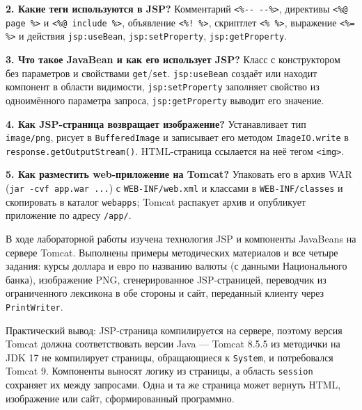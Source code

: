 \documentclass[14pt,a4paper]{extarticle}
\begin{document}
\textbf{2. Какие теги используются в JSP?} Комментарий \texttt{<\%-{}- -{}-\%>},
директивы \texttt{<\%@ page \%>} и \texttt{<\%@ include \%>}, объявление
\texttt{<\%! \%>}, скриптлет \texttt{<\% \%>}, выражение \texttt{<\%= \%>} и действия
\texttt{jsp:useBean}, \texttt{jsp:setProperty}, \texttt{jsp:getProperty}.

\textbf{3. Что такое JavaBean и как его использует JSP?} Класс с конструктором без
параметров и свойствами \texttt{get}/\texttt{set}. \texttt{jsp:useBean} создаёт или
находит компонент в области видимости, \texttt{jsp:setProperty} заполняет свойство из
одноимённого параметра запроса, \texttt{jsp:getProperty} выводит его значение.

\textbf{4. Как JSP-страница возвращает изображение?} Устанавливает тип
\texttt{image/png}, рисует в \texttt{BufferedImage} и записывает его методом
\texttt{ImageIO.write} в \texttt{response.getOutputStream()}. HTML-страница ссылается на
неё тегом \texttt{<img>}.

\textbf{5. Как разместить web-приложение на Tomcat?} Упаковать его в архив WAR
(\texttt{jar -cvf app.war ...}) с \texttt{WEB-INF/web.xml} и классами в
\texttt{WEB-INF/classes} и скопировать в каталог \texttt{webapps}; Tomcat распакует
архив и опубликует приложение по адресу \texttt{/app/}.


В ходе лабораторной работы изучена технология JSP и компоненты JavaBeans на сервере
Tomcat. Выполнены примеры методических материалов и все четыре задания: курсы доллара и
евро по названию валюты (с данными Национального банка), изображение PNG,
сгенерированное JSP-страницей, переводчик из ограниченного лексикона в обе стороны и
сайт, переданный клиенту через \texttt{PrintWriter}.

Практический вывод: JSP-страница компилируется на сервере, поэтому версия Tomcat должна
соответствовать версии Java --- Tomcat 8.5.5 из методички на JDK 17 не компилирует
страницы, обращающиеся к \texttt{System}, и потребовался Tomcat 9. Компоненты выносят
логику из страницы, а область \texttt{session} сохраняет их между запросами. Одна и та
же страница может вернуть HTML, изображение или сайт, сформированный программно.

\end{document}
